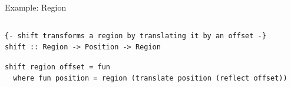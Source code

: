 \documentclass[8pt,aspectratio=169]{beamer}
\begin{document}
\begin{frame}[fragile]{Example: Region}
\begin{columns}[onlytextwidth]
\begin{column}{0.5\textwidth}
\begin{center}
\end{center}
\end{column}
\end{columns}

\vspace{3mm}

\setlength\partopsep{-\topsep}
\addtolength\partopsep{-\parskip}
\addtolength\partopsep{0.1cm}

\pause
\begin{verbatim}
{- shift transforms a region by translating it by an offset -}
shift :: Region -> Position -> Region
\end{verbatim}

\pause
\begin{verbatim}
shift region offset = fun
  where fun position = region (translate position (reflect offset))
\end{verbatim}

\setlength\partopsep{2pt}

\end{frame}

\end{document}
